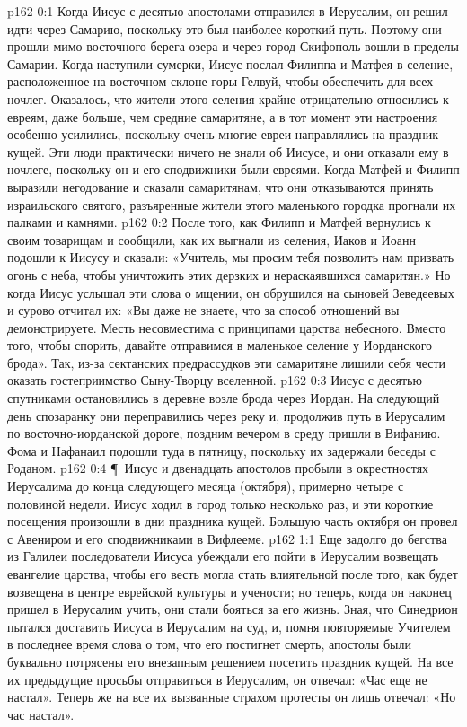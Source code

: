 \vs p162 0:1 Когда Иисус с десятью апостолами отправился в Иерусалим, он решил идти через Самарию, поскольку это был наиболее короткий путь. Поэтому они прошли мимо восточного берега озера и через город Скифополь вошли в пределы Самарии. Когда наступили сумерки, Иисус послал Филиппа и Матфея в селение, расположенное на восточном склоне горы Гелвуй, чтобы обеспечить для всех ночлег. Оказалось, что жители этого селения крайне отрицательно относились к евреям, даже больше, чем средние самаритяне, а в тот момент эти настроения особенно усилились, поскольку очень многие евреи направлялись на праздник кущей. Эти люди практически ничего не знали об Иисусе, и они отказали ему в ночлеге, поскольку он и его сподвижники были евреями. Когда Матфей и Филипп выразили негодование и сказали самаритянам, что они отказываются принять израильского святого, разъяренные жители этого маленького городка прогнали их палками и камнями.
\vs p162 0:2 После того, как Филипп и Матфей вернулись к своим товарищам и сообщили, как их выгнали из селения, Иаков и Иоанн подошли к Иисусу и сказали: «Учитель, мы просим тебя позволить нам призвать огонь с неба, чтобы уничтожить этих дерзких и нераскаявшихся самаритян.» Но когда Иисус услышал эти слова о мщении, он обрушился на сыновей Зеведеевых и сурово отчитал их: «Вы даже не знаете, что за способ отношений вы демонстрируете. Месть несовместима с принципами царства небесного. Вместо того, чтобы спорить, давайте отправимся в маленькое селение у Иорданского брода». Так, из\hyp{}за сектанских предрассудков эти самаритяне лишили себя чести оказать гостеприимство Сыну\hyp{}Творцу вселенной.
\vs p162 0:3 Иисус с десятью спутниками остановились в деревне возле брода через Иордан. На следующий день спозаранку они переправились через реку и, продолжив путь в Иерусалим по восточно\hyp{}иорданской дороге, поздним вечером в среду пришли в Вифанию. Фома и Нафанаил подошли туда в пятницу, поскольку их задержали беседы с Роданом.
\vs p162 0:4 \P\ Иисус и двенадцать апостолов пробыли в окрестностях Иерусалима до конца следующего месяца (октября), примерно четыре с половиной недели. Иисус ходил в город только несколько раз, и эти короткие посещения произошли в дни праздника кущей. Большую часть октября он провел с Авениром и его сподвижниками в Вифлееме.
\vs p162 1:1 Еще задолго до бегства из Галилеи последователи Иисуса убеждали его пойти в Иерусалим возвещать евангелие царства, чтобы его весть могла стать влиятельной после того, как будет возвещена в центре еврейской культуры и учености; но теперь, когда он наконец пришел в Иерусалим учить, они стали бояться за его жизнь. Зная, что Синедрион пытался доставить Иисуса в Иерусалим на суд, и, помня повторяемые Учителем в последнее время слова о том, что его постигнет смерть, апостолы были буквально потрясены его внезапным решением посетить праздник кущей. На все их предыдущие просьбы отправиться в Иерусалим, он отвечал: «Час еще не настал». Теперь же на все их вызванные страхом протесты он лишь отвечал: «Но час настал».
